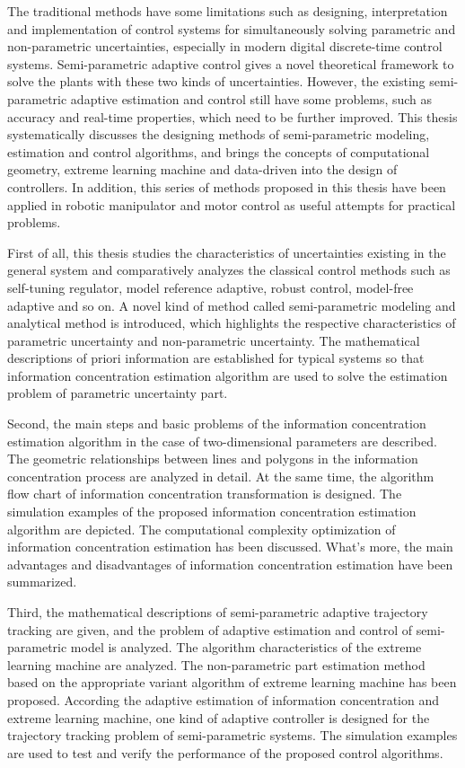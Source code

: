 \begin{englishabstract}

The traditional methods have some limitations such as designing, interpretation and implementation of control  systems for simultaneously solving parametric and non-parametric uncertainties, especially in modern digital discrete-time control systems. Semi-parametric adaptive control gives a novel theoretical framework to solve the plants with these two kinds of uncertainties. However, the existing semi-parametric adaptive estimation and control still have some problems, such as accuracy and real-time properties, which need to be further improved. This thesis systematically discusses the designing methods of semi-parametric modeling, estimation and control algorithms, and brings the concepts of computational geometry, extreme learning machine and data-driven into the design of controllers. In addition, this series of methods proposed in this thesis have been applied in robotic manipulator and motor control as useful attempts for practical problems. 

First of all, this thesis studies the characteristics of uncertainties existing in the general system and comparatively analyzes the classical control methods such as self-tuning regulator, model reference adaptive, robust control, model-free adaptive and so on. A novel kind of method called semi-parametric modeling and analytical method is introduced, which highlights the respective characteristics of parametric uncertainty and non-parametric uncertainty. The mathematical descriptions of priori information are established for typical systems so that information concentration estimation algorithm are used to solve the estimation problem of parametric uncertainty part.

Second, the main steps and basic problems of the information concentration estimation algorithm in the case of two-dimensional parameters are described. The geometric relationships between lines and polygons in the information concentration process are analyzed in detail. At the same time, the algorithm flow chart of information concentration transformation is designed. The simulation examples of the proposed information concentration estimation algorithm are depicted. The computational complexity optimization of information concentration estimation has been discussed. What's more, the main advantages and disadvantages of information concentration estimation have been summarized.

Third, the mathematical descriptions of semi-parametric adaptive trajectory tracking are given, and the problem of adaptive estimation and control of semi-parametric model is analyzed. The algorithm characteristics of the extreme learning machine are analyzed. The non-parametric part estimation method based on the appropriate variant algorithm of extreme learning machine has been proposed. According the adaptive estimation of information concentration and extreme learning machine, one kind of adaptive controller is designed for the trajectory tracking problem of semi-parametric systems. The simulation examples are used to test and verify the performance of the proposed control algorithms.


\end{englishabstract}
